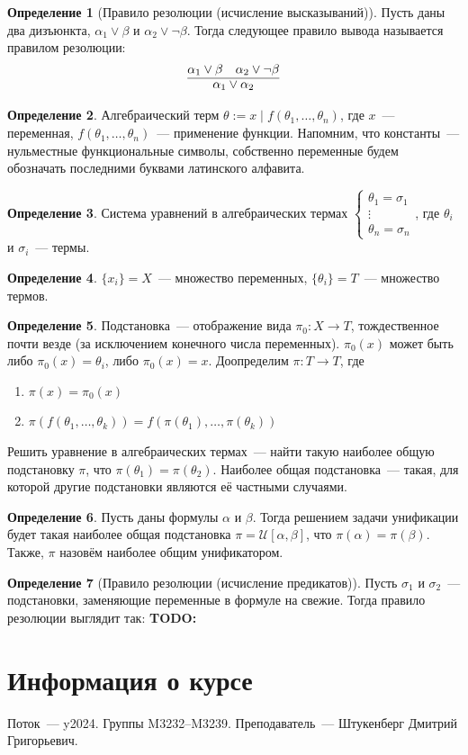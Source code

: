 \documentclass[a4paper,11pt]{article}
\theoremstyle{definition}
\newtheorem*{dfn}{Определение}
\newcommand{\todo}[1]{\textbf{TODO:} #1}
\begin{document}
\begin{dfn}[Правило резолюции (исчисление высказываний)]
Пусть даны два дизъюнкта, $\alpha_1 \vee \beta$ и $\alpha_2 \vee \neg\beta$. Тогда
следующее правило вывода называется правилом резолюции:
\[ \infer{\alpha_1 \vee \alpha_2}{\alpha_1 \vee \beta & \alpha_2 \vee \neg\beta} \]
\end{dfn}
\begin{dfn}
Алгебраический терм $\theta := x \mid f(\theta_1, \dots, \theta_n)$, где
$x$~--- переменная, $f(\theta_1, \dots, \theta_n)$~--- применение функции.
Напомним, что константы~--- нульместные функциональные символы, собственно
переменные будем обозначать последними буквами латинского алфавита.
\end{dfn}
\begin{dfn}
Система уравнений в алгебраических термах $\begin{cases}\theta_1 = \sigma_1\\
\vdots\\ \theta_n = \sigma_n\end{cases}$, где $\theta_i$ и $\sigma_i$~--- термы.
\end{dfn}
\begin{dfn}
$\{x_i\} = X$~--- множество переменных, $\{\theta_i\} = T$~--- множество термов.
\end{dfn}
\begin{dfn}
Подстановка~--- отображение вида $\pi_0 : X \to T$, тождественное почти везде (за
исключением конечного числа переменных). $\pi_0(x)$ может быть либо $\pi_0(x) =
\theta_i$, либо $\pi_0(x) = x$. Доопределим $\pi : T \to T$, где
\begin{enumerate}
\item $\pi(x) = \pi_0(x)$
\item $\pi(f(\theta_1, \dots, \theta_k)) = f(\pi(\theta_1), \dots, \pi(\theta_k))$
\end{enumerate}
Решить уравнение в алгебраических термах~--- найти такую наиболее общую
подстановку $\pi$, что $\pi(\theta_1) = \pi(\theta_2)$. Наиболее общая
подстановка~--- такая, для которой другие подстановки являются её частными
случаями.
\end{dfn}
\begin{dfn}
Пусть даны формулы $\alpha$ и $\beta$. Тогда решением задачи унификации будет
такая наиболее общая подстановка $\pi = \mathcal{U}[\alpha, \beta]$, что
$\pi(\alpha) = \pi(\beta)$. Также, $\pi$ назовём наиболее общим унификатором.
\end{dfn}
\begin{dfn}[Правило резолюции (исчисление предикатов)]
Пусть $\sigma_1$ и $\sigma_2$~--- подстановки, заменяющие переменные в формуле на
свежие. Тогда правило резолюции выглядит так: \todo{}
\end{dfn}

\section{Информация о курсе}
Поток~--- y2024. Группы M3232--M3239. Преподаватель~--- Штукенберг Дмитрий
Григорьевич.
\end{document}
